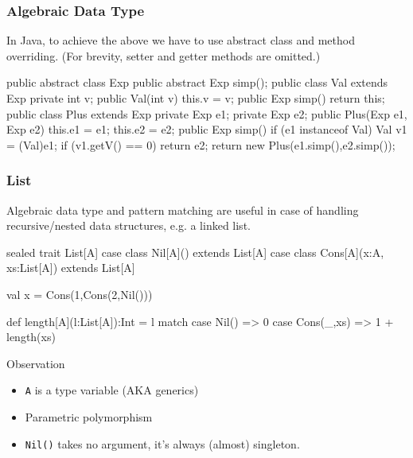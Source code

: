 \documentclass{beamer}
\newcommand{\ignore}[1]{}
\newcommand{\beb}{\begin{exampleblock}}
\newcommand{\eeb}{\end{exampleblock}}
\begin{document}
\begin{frame}[fragile]
\frametitle{Algebraic Data Type} 
In Java, to achieve the above we have to use abstract class and method
overriding. (For brevity, setter and getter methods are omitted.)
{\scriptsize
\beb{}
\begin{code}
public abstract class Exp { public abstract Exp simp(); }
public class Val extends Exp {
  private int v;
  public Val(int v) { this.v = v; }
  public Exp simp() { return this; }
}
public class Plus extends Exp {
  private Exp e1;  private Exp e2;
  public Plus(Exp e1, Exp e2) { 
    this.e1 = e1; this.e2 = e2;
  }
  public Exp simp() {
    if (e1 instanceof Val) {
      Val v1 = (Val)e1;
      if (v1.getV() == 0) { return e2; }
    }
    return new Plus(e1.simp(),e2.simp());
  }
}
\end{code}
\eeb
}
\end{frame}



\ignore{
\begin{frame}[fragile]
\frametitle{Algebraic Data Type}
\beb{}
\begin{code}
def simpFix(e:Exp):Exp = {
   val e2 = simp(e)
   if (e == e2) {
      e
   } 
   else {
      simpFix(e2)
   }
}
\end{code}
\eeb
\end{frame}
}


\begin{frame}[fragile]
\frametitle{List}
Algebraic data type and pattern matching are useful in case of
handling recursive/nested data structures, e.g. a linked list.
\beb{}
\begin{code}
sealed trait List[A]
case class Nil[A]() extends List[A]
case class Cons[A](x:A, xs:List[A]) extends List[A]

val x = Cons(1,Cons(2,Nil()))

def length[A](l:List[A]):Int = l match {
   case Nil() => 0
   case Cons(_,xs) => 1 + length(xs)
}
\end{code}
\eeb
Observation
\begin{itemize}
 \item {\tt A} is a type variable (AKA generics)
 \item Parametric polymorphism
 \item {\tt Nil()} takes no argument, it's always (almost) singleton. 
\end{itemize}
\end{frame}
\end{document}
